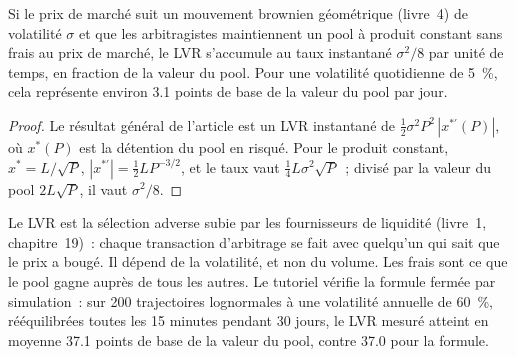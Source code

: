 \begin{proposition}\label{prop:m3:automated-market-makers:lvrcp}
Si le prix de marché suit un mouvement brownien géométrique (livre~4) de volatilité $\sigma$ et que les arbitragistes maintiennent un pool à produit constant sans frais
au prix de marché, le LVR s'accumule au taux instantané $\sigma^2/8$ par unité de temps, en fraction de la valeur du
pool. Pour une volatilité quotidienne de 5~\%, cela représente environ 3.1 points de base de la valeur du pool par jour.
\end{proposition}

\begin{proof}
Le résultat général de l'article est un LVR instantané de $\tfrac12\sigma^2P^2\,|x^{*\prime}(P)|$, où $x^*(P)$ est la détention du pool en
 risqué. Pour le produit constant, $x^* = L/\sqrt{P}$, $|x^{*\prime}| = \tfrac12 L P^{-3/2}$, et le taux vaut $\tfrac14 L\sigma^2\sqrt{P}$~;
divisé par la valeur du pool $2L\sqrt{P}$, il vaut $\sigma^2/8$.
\end{proof}

Le LVR est la sélection adverse subie par les fournisseurs de liquidité (livre~1, chapitre~19)~: chaque transaction d'arbitrage se fait avec quelqu'un qui sait que le
prix a bougé. Il dépend de la volatilité, et non du volume. Les frais sont ce que le pool gagne auprès de tous les autres. Le tutoriel vérifie la formule fermée par
simulation~: sur 200 trajectoires lognormales à une volatilité annuelle de 60~\%, rééquilibrées toutes les 15 minutes pendant 30 jours, le LVR mesuré atteint en
moyenne 37.1 points de base de la valeur du pool, contre 37.0 pour la formule.

